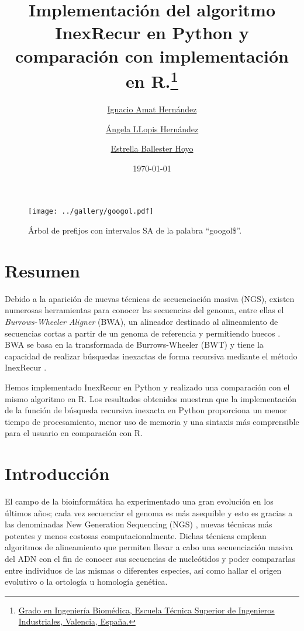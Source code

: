 \documentclass{article}
\title{\textbf{Implementación del algoritmo InexRecur en Python y
comparación con implementación en R.}\thanks{\href{https://www.upv.es/titulaciones/GIB/indexc.html}{Grado en Ingeniería Biomédica, Escuela Técnica Superior de Ingenieros Industriales, Valencia, España.}}}
\date{\today}
\author{
     \href{mailto:igamher@etsid.upv.es}{Ignacio Amat Hernández}
\and \href{mailto:ngellohe@etsii.upv.es}{Ángela LLopis Hernández}
\and \href{mailto:esbalho@etsii.upv.es}{Estrella Ballester Hoyo}
}
\begin{document}
\maketitle
\begin{figure}[h]
\centering
\texttt{[image: ../gallery/googol.pdf]}
\caption{Árbol de prefijos con intervalos SA de la palabra ``googol\$''.}
\label{fig:arbol1}
\end{figure}

\clearpage

\section*{Resumen}

Debido a la aparición  de  nuevas  técnicas  de  secuenciación	masiva
(NGS), existen numerosas herramientas para conocer las secuencias  del
genoma, entre ellas  el  \textit{Burrows-Wheeler  Aligner}  (BWA),  un
alineador destinado al alineamiento de secuencias cortas a  partir  de
un genoma de referencia y permitiendo huecos \cite{gimenez_2016}.  BWA
se basa en  la	transformada  de  Burrows-Wheeler  (BWT)  y  tiene  la
capacidad de realizar búsquedas inexactas de forma recursiva  mediante
el método InexRecur \cite{li_durbin_2009}.

Hemos implementado InexRecur en Python y realizado una comparación con
el mismo algoritmo en R.  Los resultados  obtenidos  muestran  que  la
implementación de la función de búsqueda recursiva inexacta en	Python
proporciona un menor tiempo de procesamiento, menor uso de  memoria  y
una sintaxis más comprensible para el usuario en  comparación  con  R.

\section{Introducción}


El campo de la bioinformática ha experimentado una gran  evolución  en
los últimos años; cada vez secuenciar el genoma  es  más  asequible  y
esto es gracias a las  denominadas  New  Generation  Sequencing  (NGS)
\cite{gimenez_2016}, nuevas técnicas más  potentes  y  menos  costosas
computacionalmente.    Dichas	técnicas   emplean    algoritmos    de
alineamiento que permiten llevar a cabo una secuenciación  masiva  del
ADN \cite{li_durbin_2009} con el fin  de  conocer  sus	secuencias  de
nucleótidos y poder compararlas  entre	individuos  de	las  mismas  o
diferentes  especies,  así  como  hallar  el  origen  evolutivo  o  la
ortología u homología genética.
\end{document}
